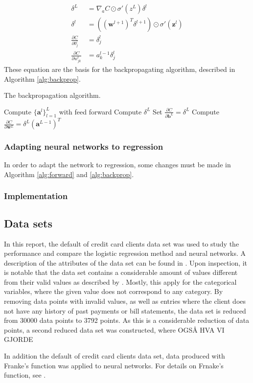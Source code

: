 \begin{equation}\label{eq:backprop}
\begin{aligned}
	\delta^L &= \nabla_aC\odot\sigma'(z^L)\delta^l \\ 
	\delta^l &= ((\boldsymbol{w}^{l+1})^T\delta^{l+1})\odot\sigma'(\boldsymbol{z}^l) \\
	\frac{\partial C}{\partial b^l_j} &= \delta_j^l \\
	\frac{\partial C}{\partial w_{jk}^l} &= a_k^{l-1}\delta^l_j
\end{aligned}
\end{equation}
These equation are the basis for the backpropagating algorithm, described in Algorithm \ref{alg:backprop}. 
\begin{algorithm}[htbp]\caption{The backpropagation algorithm.}\label{alg:backprop}
	\SetAlgoLined
	\BlankLine
	\BlankLine
	Compute $\{ \boldsymbol{a}^l\}_{l=1}^L$ with feed forward\;
	Compute $\delta^L$\;
	Set $\frac{\partial C}{\partial \boldsymbol{b}^L} = \delta^L$\;
	Compute $\frac{\partial C}{\partial \boldsymbol{w}^L} = \delta^L(\boldsymbol{a}^{L-1})^T$\;
	\BlankLine
	\BlankLine
	\end{algorithm}
	
\subsubsection*{Adapting neural networks to regression}
In order to adapt the network to regression, some changes must be made in Algorithm \ref{alg:forward} and \ref{alg:backprop}.  

\subsubsection*{Implementation}


\subsection{Data sets}
In this report, the default of credit card clients data set \citep{yeh2009UCI} was used to study the performance and compare the logistic regression method and neural networks. A description of the attributes of the data set can be found in \cite{yeh2009UCI}. Upon inspection, it is notable that the data set contains a considerable amount of values different from their valid values as described by \citeauthor{yeh2009UCI}. Mostly, this apply for the categorical variables, where the given value does not correspond to any category. By removing data points with invalid values, as well as entries where the client does not have any history of past payments or bill statements, the data set is reduced from 30000 data points to 3792 points. As this is a considerable reduction of data points, a second reduced data set was constructed, where OGSÅ HVA VI GJORDE

In addition the default of credit card clients data set, data produced with Franke's function was applied to neural networks. For details on Frnake's function, see \cite{prosjekt1}. 
